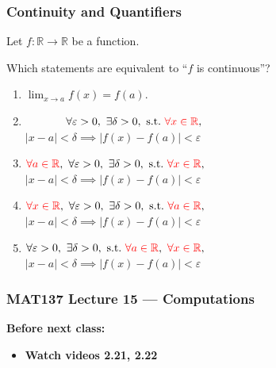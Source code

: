 \documentclass[14pt]{beamer}
\newcommand {\DS} [1] {${\displaystyle #1}$}
\begin{document}
\begin{frame}[t]
	\frametitle{Continuity and Quantifiers}
	Let $f:\mathbb R\to\mathbb R$ be a function.

	\small
	\medskip
	Which statements are equivalent to ``$f$ is continuous''?

	\begin{enumerate}
		\item \DS{\lim_{x\to a} f(x)=f(a)}.

		
			\vfill
		\item 
			$\phantom{\forall a\in \mathbb R,\ }\forall \varepsilon>0,\ \exists\delta >0,\ \text{s.t.}\ {\color{red}\forall x\in\mathbb R},$\\
			$|x-a|<\delta\implies |f(x)-f(a)|<\varepsilon$
			\vfill
		\item 
			${\color{red}\forall a\in \mathbb R},\ \forall \varepsilon>0,\ \exists\delta >0,\ \text{s.t.}\ {\color{red}\forall x\in\mathbb R},$\\
			$|x-a|<\delta\implies |f(x)-f(a)|<\varepsilon$
			\vfill
		\item 
			${\color{red}\forall x\in \mathbb R},\ \forall \varepsilon>0,\ \exists\delta >0,\ \text{s.t.}\ {\color{red}\forall a\in\mathbb R},$\\
			$|x-a|<\delta\implies |f(x)-f(a)|<\varepsilon$
			\vfill
		\item 
			$\forall \varepsilon>0,\ \exists\delta >0,\ \text{s.t.}\ {\color{red}\forall a\in \mathbb R},\ {\color{red}\forall x\in\mathbb R},$\\
			$|x-a|<\delta\implies |f(x)-f(a)|<\varepsilon$
			\vfill
	\end{enumerate}
			\vfill
	
\end{frame}


\begin{frame}
\frametitle{MAT137 Lecture 15 --- Computations}
	{\bf Before next class:}
		\begin{itemize} \normalsize
			\item {\bf Watch videos 2.21, 2.22 }
		\end{itemize}
	\vfill

\end{frame}
\end{document}
